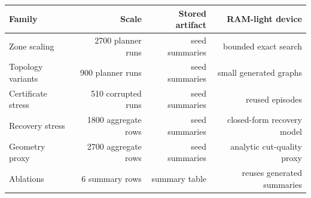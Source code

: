 \begin{tabular}{lrrr}
\toprule
Family & Scale & Stored artifact & RAM-light device \\
\midrule
Zone scaling & 2700 planner runs & seed summaries & bounded exact search \\
Topology variants & 900 planner runs & seed summaries & small generated graphs \\
Certificate stress & 510 corrupted runs & seed summaries & reused episodes \\
Recovery stress & 1800 aggregate rows & seed summaries & closed-form recovery model \\
Geometry proxy & 2700 aggregate rows & seed summaries & analytic cut-quality proxy \\
Ablations & 6 summary rows & summary table & reuses generated summaries \\
\bottomrule
\end{tabular}
